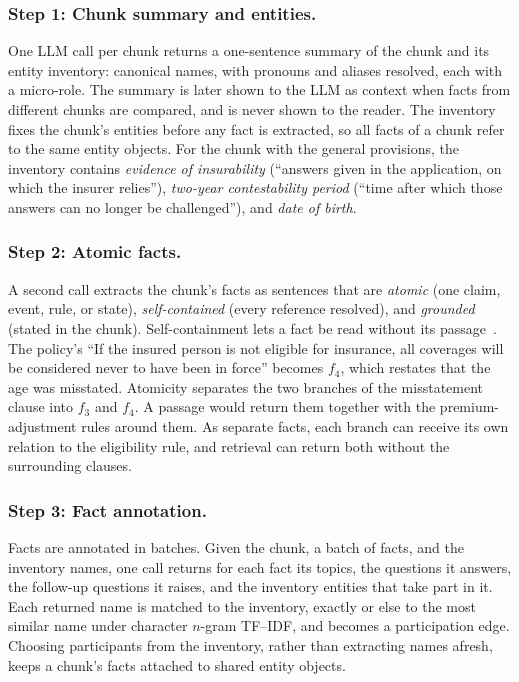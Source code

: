 \documentclass[sigconf, review, anonymous]{acmart}
\begin{document}
\subsubsection*{Step 1: Chunk summary and entities.}
One LLM call per chunk returns a one-sentence summary of the chunk and its entity inventory: canonical names, with pronouns and aliases resolved, each with a micro-role. The summary is later shown to the LLM as context when facts from different chunks are compared, and is never shown to the reader. The inventory fixes the chunk's entities before any fact is extracted, so all facts of a chunk refer to the same entity objects. For the chunk with the general provisions, the inventory contains \emph{evidence of insurability} (``answers given in the application, on which the insurer relies''), \emph{two-year contestability period} (``time after which those answers can no longer be challenged''), and \emph{date of birth}.

\subsubsection*{Step 2: Atomic facts.}
A second call extracts the chunk's facts as sentences that are \emph{atomic} (one claim, event, rule, or state), \emph{self-contained} (every reference resolved), and \emph{grounded} (stated in the chunk). Self-containment lets a fact be read without its passage~\cite{chen2024dense,min2023factscore}. The policy's ``If the insured person is not eligible for insurance, all coverages will be considered never to have been in force'' becomes $f_4$, which restates that the age was misstated. Atomicity separates the two branches of the misstatement clause into $f_3$ and $f_4$. A passage would return them together with the premium-adjustment rules around them. As separate facts, each branch can receive its own relation to the eligibility rule, and retrieval can return both without the surrounding clauses.

\subsubsection*{Step 3: Fact annotation.}
Facts are annotated in batches. Given the chunk, a batch of facts, and the inventory names, one call returns for each fact its topics, the questions it answers, the follow-up questions it raises, and the inventory entities that take part in it. Each returned name is matched to the inventory, exactly or else to the most similar name under character $n$-gram TF--IDF, and becomes a participation edge. Choosing participants from the inventory, rather than extracting names afresh, keeps a chunk's facts attached to shared entity objects.
\end{document}
